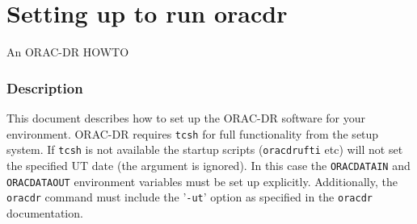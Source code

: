 \documentclass[twoside,11pt]{article}
\renewcommand{\_}{\texttt{\symbol{95}}}
\begin{document}
\section{Setting up to run oracdr\label{Setting_up_to_run_oracdr}}


An ORAC-DR HOWTO

\subsubsection*{Description\label{Setting_up_to_run_oracdr_Description}}


This document describes how to set up the ORAC-DR software for your
environment. ORAC-DR requires \texttt{tcsh} for full functionality from the
setup system. If \texttt{tcsh} is not available the startup scripts
(\texttt{oracdr\_ufti} etc) will not set the specified UT date (the argument
is ignored). In this case the \texttt{ORAC\_DATA\_IN} and \texttt{ORAC\_DATA\_OUT}
environment variables must be set up explicitly. Additionally, the
\texttt{oracdr} command must include the '\texttt{-ut}' option as specified in the
\texttt{oracdr} documentation.
\end{document}
